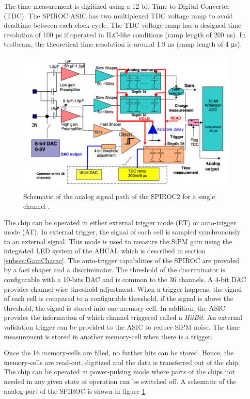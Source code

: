 The time measurement is digitized using a 12-bit Time to Digital Converter (TDC). The SPIROC ASIC has two multiplexed TDC voltage ramp to avoid deadtime between each clock cycle. The TDC voltage ramp has a designed time resolution of 100 ps if operated in ILC-like conditions (ramp length of 200 \si{\nano\second}). In testbeam, the theoretical time resolution is around 1.9 ns (ramp length of 4 \si{\micro\second}).

\begin{figure}[htbp!]
  \centering
  \includegraphics[width=0.7\linewidth]{chap3/fig/SPIROC2B_schematic.png}
  \caption{Schematic of the analog signal path of the SPIROC2 for a single channel \cite{SPIROC2_datasheet}.} \label{fig:SPIROC2B_sche}
\end{figure}

The chip can be operated in either external trigger mode (ET) or auto-trigger mode (AT). In external trigger, the signal of each cell is sampled synchronously to an external signal. This mode is used to measure the SiPM gain using the integrated LED system of the AHCAL which is described in section \ref{subsec:GainCharac}. The auto-trigger capabilities of the SPIROC are provided by a fast shaper and a discriminator. The threshold of the discriminator is configurable with a 10-bits DAC and is common to the 36 channels. A 4-bit DAC provides channel-wise threshold adjustment. When a trigger happens, the signal of each cell is compared to a configurable threshold, if the signal is above the threshold, the signal is stored into one memory-cell. In addition, the ASIC provides the information of which channel triggered called a \textit{HitBit}. An external validation trigger can be provided to the ASIC to reduce SiPM noise. The time measurement is stored in another memory-cell when there is a trigger.

Once the 16 memory-cells are filled, no further hits can be stored. Hence, the memory-cells are read-out, digitized and the data is transferred out of the chip. The chip can be operated in power-pulsing mode where parts of the chips not needed in any given state of operation can be switched off. A schematic of the analog part of the SPIROC is shown in figure \ref{fig:SPIROC2B_sche}.

